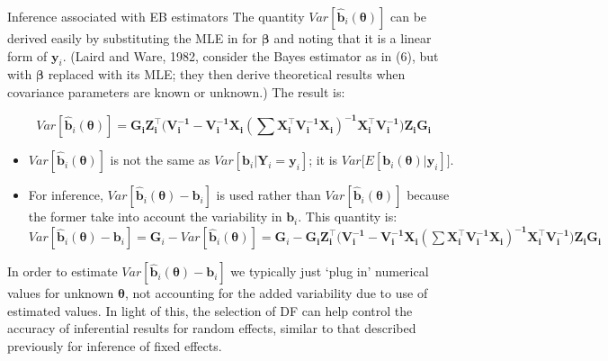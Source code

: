 \documentclass[
  9pt,
  ignorenonframetext,
]{beamer}
\begin{document}
\begin{frame}{Inference associated with EB estimators}
\protect\hypertarget{inference-associated-with-eb-estimators}{}
The quantity \(Var[\pmb {\hat b}_i (\pmb \theta)]\) can be derived
easily by substituting the MLE in for \(\pmb \beta\) and noting that it
is a linear form of \(\pmb y_i\). (Laird and Ware, 1982, consider the
Bayes estimator as in (6), but with \(\pmb \beta\) replaced with its
MLE; they then derive theoretical results when covariance parameters are
known or unknown.) The result is:

\[
Var[\pmb {\hat b}_i (\pmb \theta)] = \pmb {G_i Z^{\top}_i\Big(V_i^{-1}-V_i^{-1} X_i (\sum X_i^{\top}V_i^{-1} X_i)^{-1} X_i^{\top}V_i^{-1}\Big)Z_i G_i}
\]

\begin{itemize}
\item
  \(Var[\pmb {\hat b}_i (\pmb \theta)]\) is not the same as
  \(Var[\pmb b_i |\pmb Y_i= \pmb y_i]\); it is
  \(Var \Big[ E[\pmb b_i (\pmb \theta)|\pmb y_i]\Big]\).
\item
  For inference, \(Var[\pmb {\hat b}_i (\pmb \theta) - \pmb b_i]\) is
  used rather than \(Var[\pmb {\hat b}_i (\pmb \theta)]\) because the
  former take into account the variability in \(\pmb b_i\). This
  quantity is:
  \(Var[ \pmb {\hat b}_i (\pmb \theta)- \pmb b_i] = \pmb G_i - Var[ \pmb {\hat b}_i (\pmb \theta)] = \pmb G_i - \pmb {G_i Z_i^{\top}\Big({V_i^{-1}-V_i^{-1} X_i (\sum X_i^{\top}V_i^{-1} X_i)^{-1} X_i^{\top}V_i^{-1}}\Big)Z_i G_i}\)
\end{itemize}

In order to estimate \(Var[ \pmb {\hat b}_i (\pmb \theta)- \pmb b_i]\)
we typically just `plug in' numerical values for unknown
\(\pmb \theta\), not accounting for the added variability due to use of
estimated values. In light of this, the selection of DF can help control
the accuracy of inferential results for random effects, similar to that
described previously for inference of fixed effects.
\end{frame}
\end{document}
